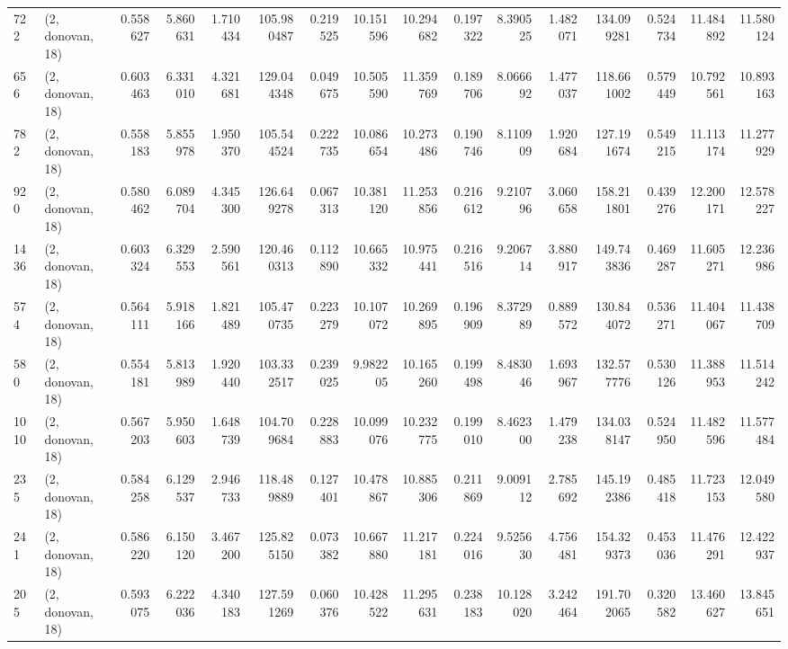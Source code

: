 \begin{tabular}{llrrrrrrrrrrrrrr}
722  &  (2, donovan, 18) &   0.558627 &   5.860631 &   1.710434 &    105.980487 &    0.219525 &   10.151596 &   10.294682 &  0.197322 &   8.390525 &   1.482071 &   134.099281 &   0.524734 &  11.484892 &  11.580124 \\
656  &  (2, donovan, 18) &   0.603463 &   6.331010 &   4.321681 &    129.044348 &    0.049675 &   10.505590 &   11.359769 &  0.189706 &   8.066692 &   1.477037 &   118.661002 &   0.579449 &  10.792561 &  10.893163 \\
782  &  (2, donovan, 18) &   0.558183 &   5.855978 &   1.950370 &    105.544524 &    0.222735 &   10.086654 &   10.273486 &  0.190746 &   8.110909 &   1.920684 &   127.191674 &   0.549215 &  11.113174 &  11.277929 \\
920  &  (2, donovan, 18) &   0.580462 &   6.089704 &   4.345300 &    126.649278 &    0.067313 &   10.381120 &   11.253856 &  0.216612 &   9.210796 &   3.060658 &   158.211801 &   0.439276 &  12.200171 &  12.578227 \\
1436 &  (2, donovan, 18) &   0.603324 &   6.329553 &   2.590561 &    120.460313 &    0.112890 &   10.665332 &   10.975441 &  0.216516 &   9.206714 &   3.880917 &   149.743836 &   0.469287 &  11.605271 &  12.236986 \\
574  &  (2, donovan, 18) &   0.564111 &   5.918166 &   1.821489 &    105.470735 &    0.223279 &   10.107072 &   10.269895 &  0.196909 &   8.372989 &   0.889572 &   130.844072 &   0.536271 &  11.404067 &  11.438709 \\
580  &  (2, donovan, 18) &   0.554181 &   5.813989 &   1.920440 &    103.332517 &    0.239025 &    9.982205 &   10.165260 &  0.199498 &   8.483046 &   1.693967 &   132.577776 &   0.530126 &  11.388953 &  11.514242 \\
1010 &  (2, donovan, 18) &   0.567203 &   5.950603 &   1.648739 &    104.709684 &    0.228883 &   10.099076 &   10.232775 &  0.199010 &   8.462300 &   1.479238 &   134.038147 &   0.524950 &  11.482596 &  11.577484 \\
235  &  (2, donovan, 18) &   0.584258 &   6.129537 &   2.946733 &    118.489889 &    0.127401 &   10.478867 &   10.885306 &  0.211869 &   9.009112 &   2.785692 &   145.192386 &   0.485418 &  11.723153 &  12.049580 \\
241  &  (2, donovan, 18) &   0.586220 &   6.150120 &   3.467200 &    125.825150 &    0.073382 &   10.667880 &   11.217181 &  0.224016 &   9.525630 &   4.756481 &   154.329373 &   0.453036 &  11.476291 &  12.422937 \\
205  &  (2, donovan, 18) &   0.593075 &   6.222036 &   4.340183 &    127.591269 &    0.060376 &   10.428522 &   11.295631 &  0.238183 &  10.128020 &   3.242464 &   191.702065 &   0.320582 &  13.460627 &  13.845651 \\

\end{tabular}
